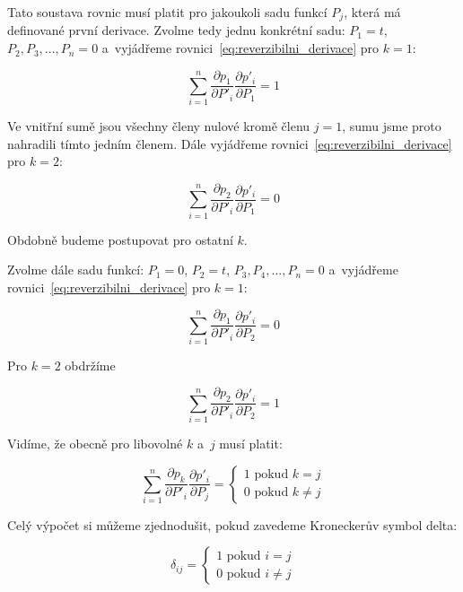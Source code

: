 Tato soustava rovnic musí platit pro jakoukoli sadu funkcí \(P_j\), která má definované první derivace. Zvolme tedy jednu konkrétní sadu: \(P_1 = t\), \(P_2, P_3, ..., P_n = 0\) a~vyjádřeme rovnici~\eqref{eq:reverzibilni_derivace} pro \(k = 1\):

\begin{equation}
\sum_{i=1}^n \frac{\partial p_1}{\partial P'_i} \frac{\partial p'_i}{\partial P_1} = 1
\end{equation}

Ve vnitřní sumě jsou všechny členy nulové kromě členu \(j = 1\), sumu jsme proto nahradili tímto jedním členem.
Dále vyjádřeme rovnici~\eqref{eq:reverzibilni_derivace} pro \(k = 2\):

\begin{equation}
\sum_{i=1}^n \frac{\partial p_2}{\partial P'_i} \frac{\partial p'_i}{\partial P_1} = 0
\end{equation}

Obdobně budeme postupovat pro ostatní \(k\).

Zvolme dále sadu funkcí: \(P_1 = 0\), \(P_2 = t\), \(P_3, P_4, ..., P_n = 0\) a~vyjádřeme rovnici~\eqref{eq:reverzibilni_derivace} pro \(k = 1\):

\begin{equation}
\sum_{i=1}^n \frac{\partial p_1}{\partial P'_i} \frac{\partial p'_i}{\partial P_2} = 0
\end{equation}

Pro \(k = 2\) obdržíme

\begin{equation}
\sum_{i=1}^n \frac{\partial p_2}{\partial P'_i} \frac{\partial p'_i}{\partial P_2} = 1
\end{equation}

Vidíme, že obecně pro libovolné \(k\) a~\(j\) musí platit:

\begin{equation}
\sum_{i=1}^n \frac{\partial p_k}{\partial P'_i} \frac{\partial p'_i}{\partial P_j} =
\begin{cases}
	1 \text{ pokud } k = j \\
	0 \text{ pokud } k \neq j
\end{cases}
\end{equation}

Celý výpočet si můžeme zjednodušit, pokud zavedeme Kroneckerův symbol delta:

\begin{equation}
\delta_{ij} =
\begin{cases}
	1 \text{ pokud } i = j \\
	0 \text{ pokud } i \neq j
\end{cases}
\end{equation}


